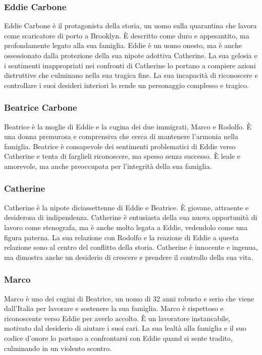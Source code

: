 \documentclass{article}
\begin{document}
\subsubsection{Eddie Carbone}
Eddie Carbone è il protagonista della storia, un uomo sulla quarantina che lavora come
scaricatore di porto a Brooklyn. È descritto come duro e appesantito, ma profondamente
legato alla sua famiglia. Eddie è un uomo onesto, ma è anche ossessionato dalla protezione
della sua nipote adottiva Catherine. La sua gelosia e i sentimenti inappropriati nei confronti
di Catherine lo portano a compiere azioni distruttive che culminano nella sua tragica fine.
La sua incapacità di riconoscere e controllare i suoi desideri interiori lo rende un
personaggio complesso e tragico.

\subsubsection{Beatrice Carbone}
Beatrice è la moglie di Eddie e la cugina dei due immigrati, Marco e Rodolfo. È una donna
premurosa e comprensiva che cerca di mantenere l'armonia nella famiglia. Beatrice è
consapevole dei sentimenti problematici di Eddie verso Catherine e tenta di farglieli
riconoscere, ma spesso senza successo. È leale e amorevole, ma anche preoccupata per
l'integrità della sua famiglia.

\subsubsection{Catherine}
Catherine è la nipote diciassettenne di Eddie e Beatrice. È giovane, attraente e desiderosa
di indipendenza. Catherine è entusiasta della sua nuova opportunità di lavoro come stenografa,
ma è anche molto legata a Eddie, vedendolo come una figura paterna. La sua relazione con
Rodolfo e la reazione di Eddie a questa relazione sono al centro del conflitto della storia.
Catherine è innocente e ingenua, ma dimostra anche un desiderio di crescere e prendere il
controllo della sua vita.

\subsubsection{Marco}
Marco è uno dei cugini di Beatrice, un uomo di 32 anni robusto e serio che viene dall'Italia
per lavorare e sostenere la sua famiglia. Marco è rispettoso e riconoscente verso Eddie per
averlo accolto. È un lavoratore instancabile, motivato dal desiderio di aiutare i suoi cari.
La sua lealtà alla famiglia e il suo codice d'onore lo portano a confrontarsi con Eddie quand
 si sente tradito, culminando in un violento scontro.
\end{document}
